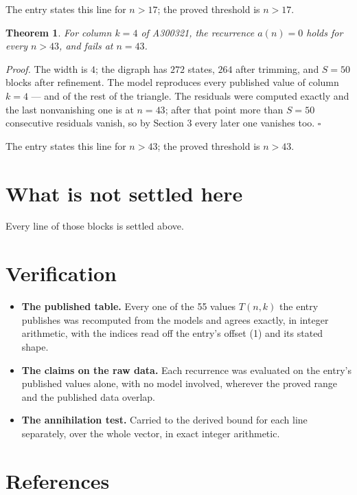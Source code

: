 \documentclass[11pt]{article}
\newtheorem{theorem}{Theorem}
\theoremstyle{definition}
\begin{document}
The entry states this line for $n > 17$; the proved threshold is $n > 17$.

\begin{theorem} For column $k = 4$ of A300321, the recurrence $a(n) = 0$ holds for every $n > 43$, and fails at $n = 43$.\end{theorem}

{\itshape Proof.} The width is $4$; the digraph has $272$ states, $264$ after trimming, and $S = 50$ blocks after refinement. The model reproduces every published value of column $k = 4$ --- and of the rest of the triangle. The residuals were computed exactly and the last nonvanishing one is at $n = 43$; after that point more than $S = 50$ consecutive residuals vanish, so by Section 3 every later one vanishes too. $\square$

The entry states this line for $n > 43$; the proved threshold is $n > 43$.

\section{What is not settled here}

Every line of those blocks is settled above.

\section{Verification}

\begin{itemize}

\item {\bfseries The published table.} Every one of the 55 values $T(n,k)$ the entry publishes was recomputed from the models and agrees exactly, in integer arithmetic, with the indices read off the entry's offset (1) and its stated shape.

\item {\bfseries The claims on the raw data.} Each recurrence was evaluated on the entry's published values alone, with no model involved, wherever the proved range and the published data overlap.

\item {\bfseries The annihilation test.} Carried to the derived bound for each line separately, over the whole vector, in exact integer arithmetic.

\end{itemize}

\section{References}
\end{document}
